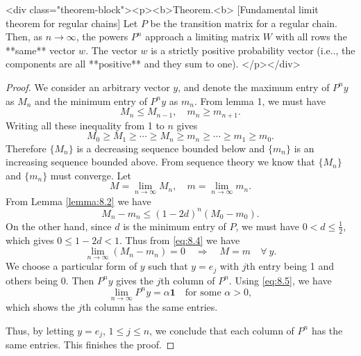 <div class="theorem-block"><p><b>Theorem.<b> [Fundamental limit theorem for regular chains]
\label{thm:8.1}
Let $P$ be the transition matrix for a regular chain. Then, as $n \to \infty$, the powers $P^n$ approach a limiting matrix $W$ with all rows the **same** vector $w$. The vector $w$ is a strictly positive probability vector (i.e.., the components are all **positive** and they sum to one).
</p></div>

\begin{proof}
We consider an arbitrary vector $y$, and denote the maximum entry of $P^n y$ as $M_n$ and the minimum entry of $P^n y$ as $m_n$. From lemma 1, we must have 
$$\begin{equation}
    M_n \leq M_{n-1}, \quad m_n \geq m_{n+1}.
\end{equation}$$
Writing all these inequality from 1 to $n$ gives
$$\begin{equation}
    M_0 \geq M_1 \geq \cdots \geq M_n \geq m_n \geq \cdots \geq m_1 \geq m_0.
\end{equation}$$
Therefore $\{M_n\}$ is a decreasing sequence bounded below and $\{m_n\}$ is an increasing sequence bounded above. From sequence theory we know that $\{ M_n \}$ and $\{m_n\}$ must converge. Let
$$\begin{equation}
    M = \lim_{n\to\infty} M_n, \quad m = \lim_{n\to\infty} m_n.
\end{equation}$$
From Lemma \ref{lemma:8.2} we have 
$$$$$$$$$$\begin{equation}
    \label{eq:8.4}
    \tag{8-4}
    M_n - m_n \leq (1-2d)^n (M_0 - m_0).
\end{equation}$$$$$$$$$$
On the other hand, since $d$ is the minimum entry of $P$, we must have $0 < d \leq \frac{1}{2}$, which gives $0 \leq 1-2d < 1$. Thus from \eqref{eq:8.4} we have 
$$$$$$$$$$\begin{equation}
    \label{eq:8.5}
    \tag{8-5}
    \lim_{n\to\infty} (M_n - m_n) = 0 \quad \Rightarrow \quad 
    M=m \quad \forall \ y.
\end{equation}$$$$$$$$$$
We choose a particular form of $y$ such that $y = e_j$ with $j$th entry being 1 and others being 0. Then $P^n y$ gives the $j$th column of $P^n$. Using \eqref{eq:8.5}, we have
$$\begin{equation}
    \lim_{n\to\infty} P^n y = \alpha \mathbf{1} \quad \text{for some $\alpha > 0$},
\end{equation}$$
which shows the $j$th column has the same entries.

Thus, by letting $y = e_j$, $1\leq j \leq n$, we conclude that each column of $P^n$ has the same entries. This finishes the proof.
\end{proof}

